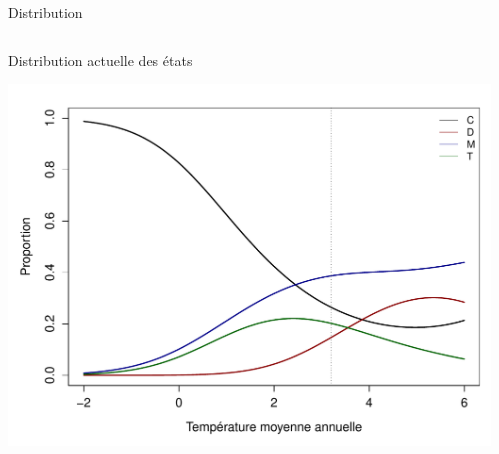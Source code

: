 \documentclass{eecslides}
\begin{document}
		\begin{frame}{Distribution}
		\begin{columns}
			\begin{column}{0.5\textwidth}
				Distribution actuelle des états
								\begin{center}
					\includegraphics[height=0.4\textheight]{SDM}
				\end{center}
			\end{column}
			\begin{column}{0.5\textwidth}
			\end{column}
		\end{columns}	    	
	\end{frame}

\end{document}
